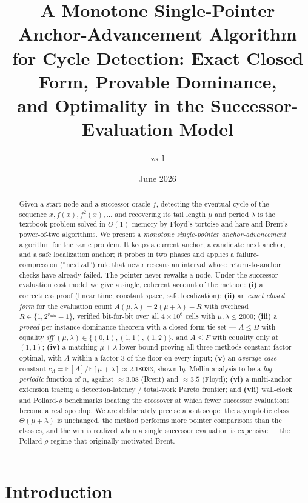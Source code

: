 \documentclass[11pt]{article}
\title{A Monotone Single-Pointer Anchor-Advancement Algorithm\\
for Cycle Detection: Exact Closed Form, Provable Dominance,\\
and Optimality in the Successor-Evaluation Model}
\author{zx l}
\date{June 2026}
\begin{document}
\maketitle

\begin{abstract}
Given a start node and a successor oracle $f$, detecting the eventual cycle of
the sequence $x,f(x),f^2(x),\dots$ and recovering its tail length $\mu$ and
period $\lambda$ is the textbook problem solved in $O(1)$ memory by Floyd's
tortoise-and-hare and Brent's power-of-two algorithms. We present a
\emph{monotone single-pointer anchor-advancement} algorithm for the same
problem. It keeps a current anchor, a candidate next anchor, and a safe
localization anchor; it probes in two phases and applies a failure-compression
(``nextval'') rule that never rescans an interval whose return-to-anchor checks
have already failed. The pointer never rewalks a node. Under the
successor-evaluation cost model we give a single, coherent account of the method:
\textbf{(i)} a correctness proof (linear time, constant space, safe
localization); \textbf{(ii)} an \emph{exact closed form} for the
evaluation count $A(\mu,\lambda)=2(\mu+\lambda)+R$ with overhead
$R\in\{1,2^{r_{\min}}-1\}$, verified bit-for-bit over all $4{\times}10^{6}$ cells
with $\mu,\lambda\le 2000$; \textbf{(iii)} a \emph{proved} per-instance dominance
theorem with a closed-form tie set --- $A\le B$ with equality \emph{iff}
$(\mu,\lambda)\in\{(0,1),(1,1),(1,2)\}$, and $A\le F$ with equality only at
$(1,1)$; \textbf{(iv)} a matching $\mu+\lambda$ lower bound proving all three
methods constant-factor optimal, with $A$ within a factor $3$ of the floor on
every input; \textbf{(v)} an \emph{average-case} constant
$c_A=\mathbb E[A]/\mathbb E[\mu+\lambda]\approx 2.18033$, shown by Mellin analysis
to be a \emph{log-periodic} function of $n$, against $\approx 3.08$ (Brent) and
$\approx 3.5$ (Floyd); \textbf{(vi)} a multi-anchor extension tracing a
detection-latency / total-work Pareto frontier; and \textbf{(vii)} wall-clock and
Pollard-$\rho$ benchmarks locating the crossover at which fewer successor
evaluations become a real speedup. We are deliberately precise about scope: the
asymptotic class $\Theta(\mu+\lambda)$ is unchanged, the method performs more
pointer comparisons than the classics, and the win is realized when a single
successor evaluation is expensive --- the Pollard-$\rho$ regime that originally
motivated Brent.
\end{abstract}

\section{Introduction}
\label{sec:intro}
\end{document}
